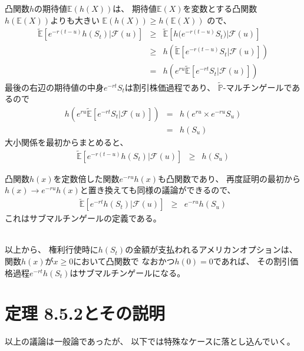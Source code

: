 \documentclass[uplatex,a4j,12pt,dvipdfmx]{jsarticle}
\begin{document}
凸関数$h$の期待値$\mathbb{E}(h(X))$は、
期待値$\mathbb{E}(X)$を変数とする凸関数$h(\mathbb{E}(X))$よりも大きい
$
	\mathbb{E}(h(X))
	\geq
	h(\mathbb{E}(X))
$
ので、
%
%
\begin{eqnarray*}
	\tilde{\mathbb{E}} \left[
		e^{-r(t-u)} h(S_{t})
		\Big| \mathcal{F}(u)
		\right]
	&\geq&
	\tilde{\mathbb{E}} \left[
		h \Big( e^{-r(t-u)} S_{t} \Big)
		\Big|
		\mathcal{F}(u) \right]
	\\
	&\geq&
	h \left(
	\tilde{\mathbb{E}} \left[
		e^{-r(t-u)} S_{t}
		\Big|
		\mathcal{F}(u) \right]
	\right)
	\\
	&=&
	h \left(
	e^{ru}
	\tilde{\mathbb{E}} \left[
		e^{-rt} S_{t}
		\Big|
		\mathcal{F}(u) \right]
	\right)
\end{eqnarray*}
%
%
最後の右辺の期待値の中身$e^{-rt} S_{t}$は割引株価過程であり、
$\tilde{\mathbb{P}}$-マルチンゲールであるので
%
%
\begin{eqnarray*}
	h \left(
	e^{ru}
	\tilde{\mathbb{E}} \left[
		e^{-rt} S_{t}
		\Big|
		\mathcal{F}(u) \right]
	\right)
	&=&
	h \left(
	e^{ru}
	\times
	e^{-ru} S_{u}
	\right)
	\\ &=&
	h(S_{u})
\end{eqnarray*}
%
%
大小関係を最初からまとめると、
%
%
\begin{eqnarray*}
	\tilde{\mathbb{E}} \left[
		e^{-r(t-u)} h(S_{t})
		\Big| \mathcal{F}(u)
		\right]
	&\geq&
	h(S_{u})
\end{eqnarray*}
%
%

凸関数$h(x)$を定数倍した関数$e^{-ru}h(x)$も凸関数であり、
再度証明の最初から$h(x) \to e^{-ru}h(x)$と置き換えても同様の議論ができるので、
%
%
\begin{eqnarray*}
	\tilde{\mathbb{E}} \left[
		e^{-rt} h(S_{t})
		\Big| \mathcal{F}(u)
		\right]
	&\geq&
	e^{-ru}
	h(S_{u})
\end{eqnarray*}
%
%
これはサブマルチンゲールの定義である。

\ \\

以上から、
権利行使時に$h(S_{t})$の金額が支払われるアメリカンオプションは、
関数$h(x)$が$x \geq 0$において凸関数で
なおかつ$h(0)=0$であれば、
その割引価格過程$e^{-rt} h(S_{t})$はサブマルチンゲールになる。



\section{定理 8.5.2\cite{Shreve2004}とその説明}


以上の議論は一般論であったが、
以下では特殊なケースに落とし込んでいく。
\end{document}
